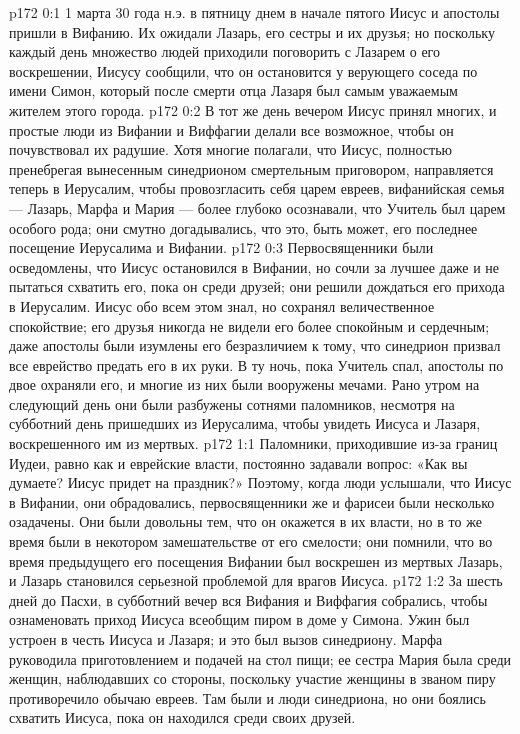 \author{Комиссия срединников}
\vs p172 0:1 1 марта 30 года н.э. в пятницу днем в начале пятого Иисус и апостолы пришли в Вифанию. Их ожидали Лазарь, его сестры и их друзья; но поскольку каждый день множество людей приходили поговорить с Лазарем о его воскрешении, Иисусу сообщили, что он остановится у верующего соседа по имени Симон, который после смерти отца Лазаря был самым уважаемым жителем этого города.
\vs p172 0:2 В тот же день вечером Иисус принял многих, и простые люди из Вифании и Виффагии делали все возможное, чтобы он почувствовал их радушие. Хотя многие полагали, что Иисус, полностью пренебрегая вынесенным синедрионом смертельным приговором, направляется теперь в Иерусалим, чтобы провозгласить себя царем евреев, вифанийская семья --- Лазарь, Марфа и Мария --- более глубоко осознавали, что Учитель был царем особого рода; они смутно догадывались, что это, быть может, его последнее посещение Иерусалима и Вифании.
\vs p172 0:3 Первосвященники были осведомлены, что Иисус остановился в Вифании, но сочли за лучшее даже и не пытаться схватить его, пока он среди друзей; они решили дождаться его прихода в Иерусалим. Иисус обо всем этом знал, но сохранял величественное спокойствие; его друзья никогда не видели его более спокойным и сердечным; даже апостолы были изумлены его безразличием к тому, что синедрион призвал все еврейство предать его в их руки. В ту ночь, пока Учитель спал, апостолы по двое охраняли его, и многие из них были вооружены мечами. Рано утром на следующий день они были разбужены сотнями паломников, несмотря на субботний день пришедших из Иерусалима, чтобы увидеть Иисуса и Лазаря, воскрешенного им из мертвых.
\vs p172 1:1 Паломники, приходившие из\hyp{}за границ Иудеи, равно как и еврейские власти, постоянно задавали вопрос: «Как вы думаете? Иисус придет на праздник?» Поэтому, когда люди услышали, что Иисус в Вифании, они обрадовались, первосвященники же и фарисеи были несколько озадачены. Они были довольны тем, что он окажется в их власти, но в то же время были в некотором замешательстве от его смелости; они помнили, что во время предыдущего его посещения Вифании был воскрешен из мертвых Лазарь, и Лазарь становился серьезной проблемой для врагов Иисуса.
\vs p172 1:2 За шесть дней до Пасхи, в субботний вечер вся Вифания и Виффагия собрались, чтобы ознаменовать приход Иисуса всеобщим пиром в доме у Симона. Ужин был устроен в честь Иисуса и Лазаря; и это был вызов синедриону. Марфа руководила приготовлением и подачей на стол пищи; ее сестра Мария была среди женщин, наблюдавших со стороны, поскольку участие женщины в званом пиру противоречило обычаю евреев. Там были и люди синедриона, но они боялись схватить Иисуса, пока он находился среди своих друзей.
